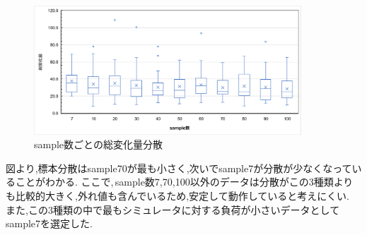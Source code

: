 \documentclass{ltjsreport}
\begin{document}
		\begin{figure}[H]
		\centering
		\includegraphics[width = 10cm]{../figs/FVRALL.png}
		\caption{sample数ごとの総変化量分散}
		\label{fig:FVRdata}
		\end{figure}
		\vspace{-15pt}
		図より,標本分散はsample70が最も小さく,次いでsample7が分散が少なくなっていることがわかる.
		ここで,\,sample数7,70,100以外のデータは分散がこの3種類よりも比較的大きく,外れ値も含んでいるため,安定して動作していると考えにくい.
		また,この3種類の中で最もシミュレータに対する負荷が小さいデータとしてsample7を選定した.
\clearpage
\end{document}
